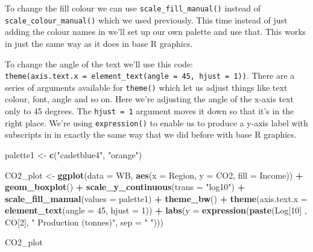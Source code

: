 \documentclass[
]{book}
\newenvironment{Shaded}{\begin{snugshade}}{\end{snugshade}}
\newcommand{\DataTypeTok}[1]{\textcolor[rgb]{0.13,0.29,0.53}{#1}}
\newcommand{\DecValTok}[1]{\textcolor[rgb]{0.00,0.00,0.81}{#1}}
\newcommand{\KeywordTok}[1]{\textcolor[rgb]{0.13,0.29,0.53}{\textbf{#1}}}
\newcommand{\NormalTok}[1]{#1}
\newcommand{\OperatorTok}[1]{\textcolor[rgb]{0.81,0.36,0.00}{\textbf{#1}}}
\newcommand{\StringTok}[1]{\textcolor[rgb]{0.31,0.60,0.02}{#1}}
\begin{document}
To change the fill colour we can use \texttt{scale\_fill\_manual()} instead of \texttt{scale\_colour\_manual()} which we used previously. This time instead of just adding the colour names in we'll set up our own palette and use that. This works in just the same way as it does in base R graphics.

To change the angle of the text we'll use this code: \texttt{theme(axis.text.x\ =\ element\_text(angle\ =\ 45,\ hjust\ =\ 1))}. There are a series of arguments available for \texttt{theme()} which let us adjust things like text colour, font, angle and so on. Here we're adjusting the angle of the x-axis text only to 45 degrees. The \texttt{hjust\ =\ 1} argument moves it down so that it's in the right place. We're using \texttt{expression()} to enable us to produce a y-axis label with subscripts in in exactly the same way that we did before with base R graphics.

\begin{Shaded}
\begin{Highlighting}[]
\NormalTok{palette1 <-}\StringTok{ }\KeywordTok{c}\NormalTok{(}\StringTok{"cadetblue4"}\NormalTok{, }\StringTok{"orange"}\NormalTok{)}

\NormalTok{CO2_plot <-}\StringTok{ }\KeywordTok{ggplot}\NormalTok{(}\DataTypeTok{data =}\NormalTok{ WB, }\KeywordTok{aes}\NormalTok{(}\DataTypeTok{x =}\NormalTok{ Region,}
                                  \DataTypeTok{y =}\NormalTok{ CO2,}
                                  \DataTypeTok{fill =}\NormalTok{ Income)) }\OperatorTok{+}
\StringTok{        }\KeywordTok{geom_boxplot}\NormalTok{() }\OperatorTok{+}
\StringTok{        }\KeywordTok{scale_y_continuous}\NormalTok{(}\DataTypeTok{trans =} \StringTok{"log10"}\NormalTok{) }\OperatorTok{+}
\StringTok{        }\KeywordTok{scale_fill_manual}\NormalTok{(}\DataTypeTok{values =}\NormalTok{ palette1) }\OperatorTok{+}
\StringTok{        }\KeywordTok{theme_bw}\NormalTok{() }\OperatorTok{+}
\StringTok{        }\KeywordTok{theme}\NormalTok{(}\DataTypeTok{axis.text.x =} \KeywordTok{element_text}\NormalTok{(}\DataTypeTok{angle =} \DecValTok{45}\NormalTok{, }\DataTypeTok{hjust =} \DecValTok{1}\NormalTok{)) }\OperatorTok{+}
\StringTok{        }\KeywordTok{labs}\NormalTok{(}\DataTypeTok{y =} \KeywordTok{expression}\NormalTok{(}\KeywordTok{paste}\NormalTok{(Log[}\DecValTok{10}\NormalTok{] , CO[}\DecValTok{2}\NormalTok{], }\StringTok{" Production (tonnes)"}\NormalTok{, }\DataTypeTok{sep =} \StringTok{" "}\NormalTok{)))}

\NormalTok{CO2_plot}
\end{Highlighting}
\end{Shaded}
\end{document}
